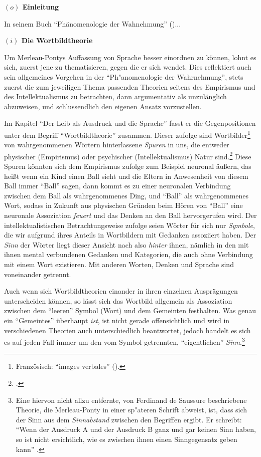 \documentclass[a4paper, 12pt]{article}
\begin{document}
\begin{onehalfspace} 

\noindent\textbf{$(o)$ Einleitung}

\noindent In seinem Buch "`Phänomenologie der Wahnehmung"' (\Cite{merleau1966phanomenologie})...


\vspace{5mm}

\noindent\textbf{$(i)$ Die Wortbildtheorie}

\noindent Um Merleau-Pontys Auffassung von Sprache besser einordnen zu können, lohnt es sich, zuerst jene zu thematisieren, gegen die er sich wendet. Dies reflektiert auch sein allgemeines Vorgehen in der "`Ph"anomenologie der Wahrnehmung"', stets zuerst die zum jeweiligen Thema passenden Theorien seitens des Empirismus und des Intellektualismus zu betrachten, dann argumentativ als unzulänglich abzuweisen, und schlussendlich den eigenen Ansatz vorzustellen. 

Im Kapitel "`Der Leib als Ausdruck und die Sprache"' fasst er die Gegenpositionen unter dem Begriff "`Wortbildtheorie"' zusammen. Dieser zufolge sind Wortbilder\footnote{Französisch: "`images verbales"' (\Cite[Siehe][S. 203]{franzoesisch_phen}).} von wahrgenommenen Wörtern hinterlassene \emph{Spuren} in uns, die entweder physischer (Empirismus) oder psychischer (Intellektualismus) Natur sind.\footnote{\Cite[Vgl.][S. 208]{merleau1966phanomenologie}.} Diese Spuren könnten sich dem Empirismus zufolge zum Beispiel neuronal äußern, das heißt wenn ein Kind einen Ball sieht und die Eltern in Anwesenheit von diesem Ball immer "`Ball"' sagen, dann kommt es zu einer neuronalen Verbindung zwischen dem Ball als wahrgenommenes Ding, und "`Ball"' als wahrgenommenes Wort, sodass in Zukunft aus physischen Gründen beim Hören von "`Ball"' eine neuronale Assoziation \emph{feuert} und das Denken an den Ball hervorgerufen wird. Der intellektualistischen Betrachtungsweise zufolge seien Wörter für sich nur \emph{Symbole}, die wir aufgrund ihres Anteils in Wortbildern mit Gedanken assoziiert haben. Der \emph{Sinn} der Wörter liegt dieser Ansicht nach also \emph{hinter} ihnen, nämlich in den mit ihnen mental verbundenen Gedanken und Kategorien, die auch ohne Verbindung mit einem Wort existieren. Mit anderen Worten, Denken und Sprache sind voneinander getrennt.

Auch wenn sich Wortbildtheorien einander in ihren einzelnen Ausprägungen unterscheiden können, so lässt sich das Wortbild allgemein als Assoziation zwischen dem "`leeren"' Symbol (Wort) und dem Gemeinten festhalten. Was genau ein "`Gemeintes"' überhaupt \emph{ist}, ist nicht gerade offensichtlich und wird in verschiedenen Theorien auch unterschiedlich beantwortet, jedoch handelt es sich es auf jeden Fall immer um den vom Symbol getrennten, "`eigentlichen"' \emph{Sinn}.\footnote{Eine hiervon nicht allzu entfernte, von Ferdinand de Saussure beschriebene Theorie, die Merleau-Ponty in einer sp"ateren Schrift abweist, ist, dass sich der Sinn aus dem \emph{Sinnabstand} zwischen den Begriffen ergibt. Er schreibt: "`Wenn der Ausdruck A und der Ausdruck B ganz und gar keinen Sinn haben, so ist nicht ersichtlich, wie es zwischen ihnen einen Sinngegensatz geben kann"' .} 


\end{onehalfspace}
\end{document}
